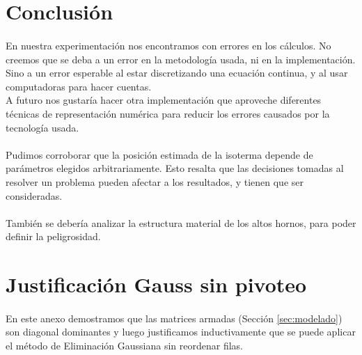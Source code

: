 \documentclass[12pt]{article}
\begin{document}


\section{Conclusión}

\paragraph{} En nuestra experimentación nos encontramos con errores en los cálculos. No creemos que se deba a un error en la metodología usada, ni en la implementación. Sino a un error esperable al estar discretizando una ecuación continua, y al usar computadoras para hacer cuentas. \\
A futuro nos gustaría hacer otra implementación que aproveche diferentes técnicas de representación numérica para reducir los errores causados por la tecnología usada.
\paragraph{} Pudimos corroborar que la posición estimada de la isoterma depende de parámetros elegidos arbitrariamente. Esto resalta que las decisiones tomadas al resolver un problema pueden afectar a los resultados, y tienen que ser consideradas. 
\paragraph{} También se debería analizar la estructura material de los altos hornos, para poder definir la peligrosidad.

\pagebreak
\appendix 

\renewcommand{\thesection}{\Roman{section}}

\section{Justificación Gauss sin pivoteo} 
\label{appendix:justificacion}

\paragraph{} En este anexo demostramos que las matrices armadas (Sección \ref{sec:modelado}) son diagonal dominantes y luego justificamos inductivamente que se puede aplicar el método de Eliminación Gaussiana sin reordenar filas.
\end{document}
